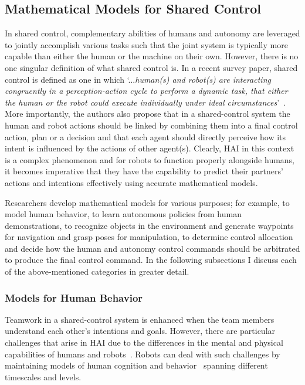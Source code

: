 \documentclass[12pt]{article}
\begin{document}
\subsection{Mathematical Models for Shared Control}
In shared control, complementary abilities of humans and autonomy are leveraged to jointly accomplish various tasks such that the joint system is typically more capable than either the human or the machine on their own. However, there is no one singular definition of what shared control is. In a recent survey paper, shared control is defined as one in which `...\textit{human(s) and robot(s) are interacting congruently in a perception-action cycle to perform a dynamic task, that either the human or the robot could execute individually under ideal circumstances}'~\cite{abbink2018topology}. More importantly, the authors also propose that in a shared-control system the human and robot actions should be linked by combining them into a final control action, plan or a decision and that each agent should directly perceive how its intent is influenced by the actions of other agent(s). Clearly, HAI in this context is a complex phenomenon and for robots to function properly alongside humans, it becomes imperative that they have the capability to predict their partners' actions and intentions effectively using accurate mathematical models. 

Researchers develop mathematical models for various purposes; for example, to model human behavior, to learn autonomous policies from human demonstrations, to recognize objects in the environment and generate waypoints for navigation and grasp poses for manipulation, to determine control allocation and decide how the human and autonomy control commands should be arbitrated to produce the final control command. In the following subsections I discuss each of the above-mentioned categories in greater detail.  

\subsubsection{Models for Human Behavior}
Teamwork in a shared-control system is enhanced when the team members understand each other's intentions and goals. However, there are particular challenges that arise in HAI  due to the differences in the mental and physical capabilities of humans and robots~\cite{hiatt2017human}. Robots can deal with such challenges by maintaining models of human cognition and behavior~\cite{javdani2015shared} spanning different timescales and levels. 
\end{document}
